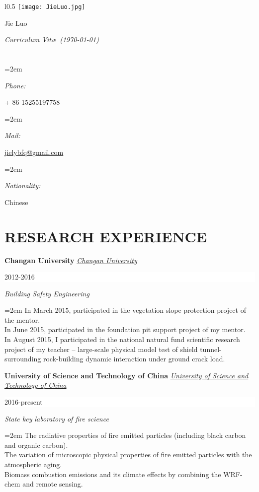 \documentclass[paper=letter,fontsize=11pt]{scrartcl} %
\newlength{\spacebox}
\newcommand{\sepspace}{\vspace*{1em}}		%
\newcommand{\MyName}[1]{ %
		\Huge \usefont{OT1}{phv}{b}{n} \hfill #1
		\par \normalsize \normalfont}
\newcommand{\MySlogan}[1]{ %
		\large \usefont{OT1}{phv}{m}{n}\hfill \textit{#1}
		\par \normalsize \normalfont}
\newcommand{\NewPart}[2]{\section*{\uppercase{#1} \small \normalfont #2}}
\newcommand{\PersonalEntry}[2]{\small
		\noindent\hangindent=2em\hangafter=0 %
		\parbox{\spacebox}{        %
		\textit{#1}}		       %
		\small\hspace{1.5em} #2 \par}    %
\newcommand{\WorkEntry}[5]{
		\noindent \textbf{#1}
        \noindent \small \textit{#2}
        \hfill      %
        \colorbox{White}{%
			\parbox{6em}{%
			\hfill\color{Black}#3}} \par  %
		\noindent \textit{#4} \par        %
		\noindent\hangindent=2em\hangafter=0 \small #5 %
		\normalsize \par}
\begin{document}

\begin{wrapfigure}{l}{0.5\textwidth}
	\vspace*{-2em}
		\texttt{[image: JieLuo.jpg]}
\end{wrapfigure}

\MyName{Jie Luo}
\MySlogan{Curriculum Vit\ae\ (\today)}

\sepspace
\sepspace

\NewPart{}{}

\PersonalEntry{Phone:}{+ 86 15255197758}
\PersonalEntry{Mail:}{\href{jielybfq@gmail.com}{jielybfq@gmail.com}}
\PersonalEntry{Nationality:}{Chinese}










\NewPart{Research Experience}{}

\WorkEntry{Changan University}{\href{http://www.xahu.edu.cn/}{Changan University}}{2012-2016} {Building Safety Engineering}{In March 2015, participated in the vegetation slope protection project of the mentor. 
\\In June 2015, participated in the foundation pit support project of my mentor.
\\In August 2015, I participated in the national natural fund scientific research project of my teacher – large-scale physical model test of shield tunnel-surrounding rock-building dynamic interaction under ground crack load.}

\sepspace

\WorkEntry{University of Science and Technology of China}{\href{https://www.ustc.edu.cn/}{University of Science and Technology of China}}{2016-present}{State key laboratory of fire science}{The radiative properties of fire emitted particles (including black carbon and organic carbon).
\\The variation of microscopic physical properties of fire emitted particles with the atmospheric aging.
\\Biomass combustion emissions and its climate effects by combining the WRF-chem and remote sensing.}

\sepspace
\end{document}
